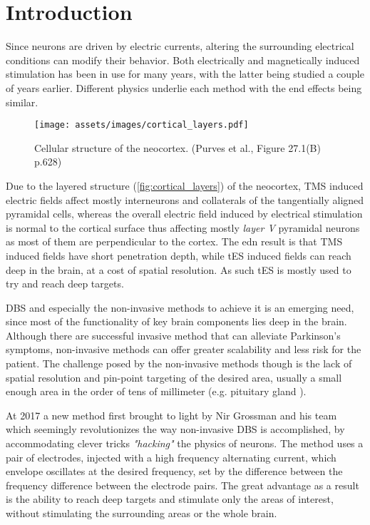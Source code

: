 \pagebreak
{}
\chapter{Introduction}

Since neurons are driven by electric currents, altering the surrounding electrical conditions can modify their behavior. Both electrically and magnetically induced stimulation has been in use for many years, with the latter being studied a couple of years earlier. Different physics underlie each method with the end effects being similar.

\begin{wrapfigure}{l}{0.40\textwidth}
    \centering
    \texttt{[image: assets/images/cortical\_layers.pdf]}
    \caption{Cellular structure of the neocortex. (Purves et al.\cite{Purves2012}, Figure 27.1(B) p.628)}
    \label{fig:cortical_layers}
\end{wrapfigure}

Due to the layered structure (\autoref{fig:cortical_layers}) of the neocortex, \gls{TMS} induced electric fields affect mostly interneurons and collaterals of the tangentially aligned pyramidal cells, whereas the overall electric field induced by electrical stimulation is normal to the cortical surface thus affecting mostly \textit{layer V} pyramidal neurons as most of them are perpendicular to the cortex. The edn result is that \gls{TMS} induced fields have short penetration depth, while \gls{tES} induced fields can reach deep in the brain, at a cost of spatial resolution. As such \gls{tES} is mostly used to try and reach deep targets.

\gls{DBS} and especially the non-invasive methods to achieve it is an emerging need, since most of the functionality of key brain components lies deep in the brain. Although there are successful invasive method that can alleviate Parkinson's symptoms, non-invasive methods can offer greater scalability and less risk for the patient. The challenge posed by the non-invasive methods though is the lack of spatial resolution and pin-point targeting of the desired area, usually a small enough area in the order of tens of millimeter (e.g. pituitary gland \cite{Yadav2017_pituitary}).

At 2017 a new method first brought to light by Nir Grossman and his team \cite{Grossman2017} which seemingly revolutionizes the way non-invasive \gls{DBS} is accomplished, by accommodating clever tricks \textit{"hacking"} the physics of neurons. The  method uses a pair of electrodes, injected with a high frequency alternating current, which envelope oscillates at the desired frequency, set by the difference between the frequency difference between the electrode pairs. The great advantage as a result is the ability to reach deep targets and stimulate only the areas of interest, without stimulating the surrounding areas or the whole brain.

